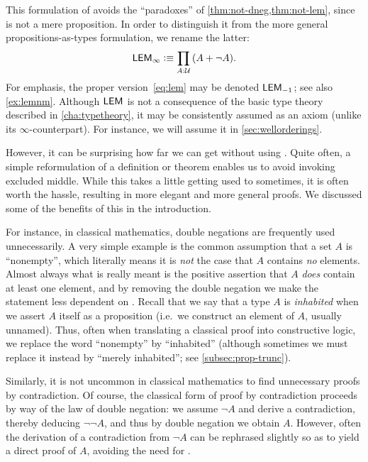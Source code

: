 This formulation of \LEM{} avoids the ``paradoxes'' of \cref{thm:not-dneg,thm:not-lem}, since \bool is not a mere proposition.
In order to distinguish it from the more general propositions-as-types formulation, we rename the latter:
\begin{equation*}
  \LEM\infty \defeq \prd{A:\UU} (A + \neg A).
\end{equation*}
For emphasis, the proper version~\eqref{eq:lem}
may be denoted $\mathsf{LEM}_{-1}$;
see also \cref{ex:lemnm}.
Although $\mathsf{LEM}_{}$
is not a consequence of the basic type theory described in \cref{cha:typetheory}, it may be consistently assumed as an axiom (unlike its $\infty$-counterpart).
For instance, we will assume it in \cref{sec:wellorderings}.

However, it can be surprising how far we can get without using \LEM{}.
Quite often, a simple reformulation of a definition or theorem enables us to avoid invoking excluded middle.
While this takes a little getting used to sometimes, it is often worth the hassle, resulting in more elegant and more general proofs.
We discussed some of the benefits of this in the introduction.

For instance, in classical mathematics, double negations are frequently used unnecessarily.
A very simple example is the common assumption that a set $A$ is ``nonempty'', which literally means it is \emph{not} the case that $A$ contains \emph{no} elements.
Almost always what is really meant is the positive assertion that $A$ \emph{does} contain at least one element, and by removing the double negation we make the statement less dependent on \LEM{}.
Recall that we say that a type $A$ is \emph{inhabited}
%
when we assert $A$ itself as a proposition (i.e.\ we construct an element of $A$, usually unnamed).
Thus, often when translating a classical proof into constructive logic, we replace the word ``nonempty'' by ``inhabited'' (although sometimes we must replace it instead by ``merely inhabited''; see \cref{subsec:prop-trunc}).

Similarly, it is not uncommon in classical mathematics to find unnecessary proofs by contradiction.
%
Of course, the classical form of proof by contradiction proceeds by way of the law of double negation: we assume $\neg A$ and derive a contradiction, thereby deducing $\neg \neg A$, and thus by double negation we obtain $A$.
However, often the derivation of a contradiction from $\neg A$ can be rephrased slightly so as to yield a direct proof of $A$, avoiding the need for \LEM{}.

